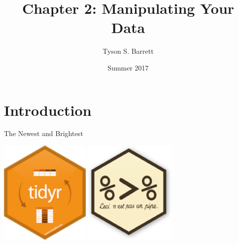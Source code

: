 \documentclass[ignorenonframetext,]{beamer}
\title{Chapter 2: Manipulating Your Data}
\author{Tyson S. Barrett}
\date{Summer 2017}
\begin{document}
\frame{\titlepage}

\begin{frame}
\tableofcontents[hideallsubsections]
\end{frame}

\section{Introduction}\label{introduction}

\begin{frame}{The Newest and Brightest}

\centerline{\includegraphics[height=2in]{Figures/tidyr_logo.png} \text{  \LARGE    }
\includegraphics[height=2in]{Figures/pipe_logo.png}}

\end{frame}
\end{document}
